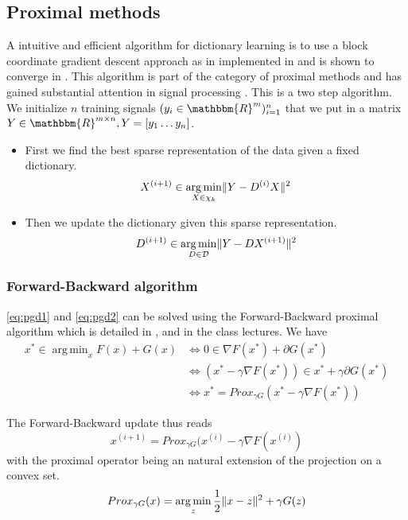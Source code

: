\documentclass[a4paper,11pt]{article}
\newcommand{\RR}{\mathbbm{R}} %
\DeclarePairedDelimiter\norm{\lVert}{\rVert} %
\DeclareMathOperator*{\argmin}{arg\,min} %
\begin{document}
\subsection{Proximal methods}
A intuitive and efficient algorithm for dictionary learning is to use a block coordinate gradient descent approach as in implemented in \cite{nt4} and is shown to converge in \cite{tseng01}.
This algorithm is part of the category of proximal methods and has gained substantial attention in signal processing \cite{combettes11}.
This is a two step algorithm.
We initialize $n$ training signals $(y_i \in \RR^m)_{i=1}^{n}$
that we put in a matrix $Y \in \RR^{m \times n}, Y = [y_1 \ldots y_n]$.
\begin{itemize}
  \item First we find the best sparse representation of the data given a fixed dictionary.
  	\begin{equation} \label{eq:pgd1}
      X^{(i+1)} \in \argmin_{X \in \chi_k} \norm{Y - D^{(i)}X}^2
	\end{equation}
  \item Then we update the dictionary given this sparse representation.
  	\begin{equation} \label{eq:pgd2}
      D^{(i+1)} \in \argmin_{D \in \mathcal{D}} \norm{Y - DX^{(i+1)}}^2
	\end{equation}
\end{itemize}


\subsubsection*{Forward-Backward algorithm}
\ref{eq:pgd1} and \ref{eq:pgd2} can be solved using the Forward-Backward proximal algorithm which is detailed in \cite{combettes11}, \cite{parikh14} and in the class lectures.
We have
\begin{equation*}
\begin{split}
x^* \in \argmin_x F(x) + G(x) & \Longleftrightarrow 0 \in \nabla F(x^*) + \partial G(x^*)\\
							  & \Longleftrightarrow (x^* - \gamma \nabla F(x^*)) \in x^* + \gamma \partial G(x^*)\\
                              & \Longleftrightarrow x^* = Prox_{\gamma G} (x^* - \gamma \nabla F(x^*))
\end{split}
\end{equation*}

The Forward-Backward update thus reads
$$x^{(i+1)} = Prox_{\gamma G} (x^{(i)} - \gamma \nabla F(x^{(i)})$$
with the proximal operator being an natural extension of the projection on a convex set.
$$Prox_{\gamma G}(x) = \argmin_z \frac{1}{2} \norm{x - z}^2 + \gamma G(z)$$
\end{document}
